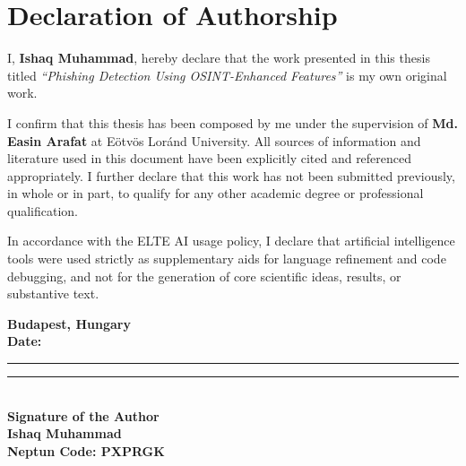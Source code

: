 \chapter*{Declaration of Authorship}

I, \textbf{Ishaq Muhammad}, hereby declare that the work presented in this thesis titled \emph{``Phishing Detection Using OSINT-Enhanced Features''} is my own original work.

I confirm that this thesis has been composed by me under the supervision of \textbf{Md. Easin Arafat} at Eötvös Loránd University. All sources of information and literature used in this document have been explicitly cited and referenced appropriately. I further declare that this work has not been submitted previously, in whole or in part, to qualify for any other academic degree or professional qualification.



In accordance with the ELTE AI usage policy, I declare that artificial intelligence tools were used strictly as supplementary aids for language refinement and code debugging, and not for the generation of core scientific ideas, results, or substantive text.

\vspace{3cm}

\noindent
\begin{minipage}[t]{0.45\textwidth}
\textbf{Budapest, Hungary}\\
\textbf{Date:} \rule{4cm}{0.4pt}
\end{minipage}%
\hfill
\begin{minipage}[t]{0.45\textwidth}
\centering
\rule{6cm}{0.4pt}\\
\textbf{Signature of the Author}\\
\textbf{Ishaq Muhammad}\\
\textbf{Neptun Code: PXPRGK}
\end{minipage}

\vfill
